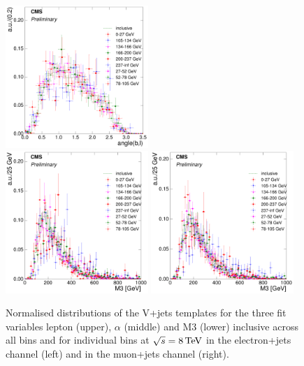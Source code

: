 \begin{figure}[hbtp]
     \includegraphics[width=0.48\textwidth]{Chapters/04_Analysis/04b_XSections/images/8TeV/fit_variables/muon/WPT/angle_bl/vjets/WPT_angle_bl_2orMoreBtags_VJets_template_comparison.pdf}\\
     \includegraphics[width=0.48\textwidth]{Chapters/04_Analysis/04b_XSections/images/8TeV/fit_variables/electron/WPT/M3/vjets/WPT_M3_2orMoreBtags_VJets_template_comparison.pdf}\hfill
     \includegraphics[width=0.48\textwidth]{Chapters/04_Analysis/04b_XSections/images/8TeV/fit_variables/muon/WPT/M3/vjets/WPT_M3_2orMoreBtags_VJets_template_comparison.pdf}\\
	 \caption[Normalised distributions of the V+jets templates for the three fit variables in \wpt
	 bins at $\sqrt{s}=8\TeV$]{Normalised distributions of the V+jets templates for the three fit variables
	 lepton \abseta (upper), $\alpha$ (middle) and M3 (lower) inclusive across all \wpt bins and for individual
	 \wpt bins at $\sqrt{s}=8\TeV$ in the electron+jets channel (left) and in the muon+jets channel (right).}
     \label{fig:WPT_fit_variable_vjets_comparisons_8TeV}
\end{figure}



